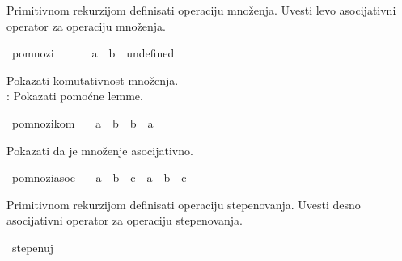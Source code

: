 \begin{isabellebody}
\begin{exercise}[subtitle=Zasnivanje prirodnih brojeva.]
{\isafoldproof}%
%
\isadelimproof
%
\endisadelimproof
%
\begin{isamarkuptext}%
Primitivnom rekurzijom definisati operaciju množenja. Uvesti levo 
      asocijativni operator \isa{{\isasymotimes}} za operaciju množenja.%
\end{isamarkuptext}\isamarkuptrue%
\isamarkupfalse%
\ pomnozi\ {\isacharparenleft}{\kern0pt}\ {\isachardoublequoteopen}{\isasymotimes}{\isachardoublequoteclose}\ {}{}{}{\isacharparenright}{\kern0pt}\ \isanewline
\ \ {\isachardoublequoteopen}a\ {\isasymotimes}\ b\ {\isacharequal}{\kern0pt}\ undefined{\isachardoublequoteclose}%
\begin{isamarkuptext}%
Pokazati komutativnost množenja.\\
     : Pokazati pomoćne lemme.%
\end{isamarkuptext}\isamarkuptrue%
\isamarkupfalse%
\ pomnozi{\isacharunderscore}{\kern0pt}kom{\isacharcolon}{\kern0pt}\isanewline
\ \ \ {\isachardoublequoteopen}a\ {\isasymotimes}\ b\ {\isacharequal}{\kern0pt}\ b\ {\isasymotimes}\ a{\isachardoublequoteclose}\isanewline
\ \ %
\isadelimproof
%
\endisadelimproof
%
\isatagproof
%
\endisatagproof
{\isafoldproof}%
%
\isadelimproof
%
\endisadelimproof
%
\begin{isamarkuptext}%
Pokazati da je množenje asocijativno.%
\end{isamarkuptext}\isamarkuptrue%
\isamarkupfalse%
\ pomnozi{\isacharunderscore}{\kern0pt}asoc{\isacharcolon}{\kern0pt}\isanewline
\ \ \ {\isachardoublequoteopen}a\ {\isasymotimes}\ {\isacharparenleft}{\kern0pt}b\ {\isasymotimes}\ c{\isacharparenright}{\kern0pt}\ {\isacharequal}{\kern0pt}\ a\ {\isasymotimes}\ b\ {\isasymotimes}\ c{\isachardoublequoteclose}\isanewline
\ \ %
\isadelimproof
%
\endisadelimproof
%
\isatagproof
%
\endisatagproof
{\isafoldproof}%
%
\isadelimproof
%
\endisadelimproof
%
\begin{isamarkuptext}%
Primitivnom rekurzijom definisati operaciju stepenovanja. Uvesti desno 
      asocijativni operator \isa{{\isasymZcat}} za operaciju stepenovanja.%
\end{isamarkuptext}\isamarkuptrue%
\isamarkupfalse%
\ stepenuj\ {\isacharparenleft}{\kern0pt}\ {\isachardoublequoteopen}{\isasymZcat}{\isachardoublequoteclose}\ {}{}{}{\isacharparenright}{\kern0pt}\ \isanewline

\end{exercise}
\end{isabellebody}
